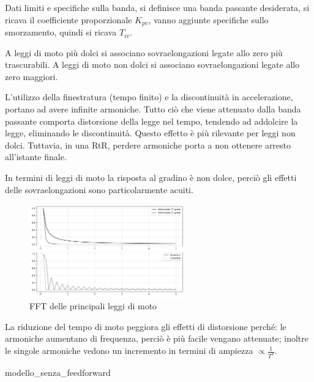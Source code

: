 Dati limiti e specifiche sulla banda, si definisce una banda passante desiderata, si ricava il coefficiente proporzionale \(K_{pv}\), vanno aggiunte specifiche sullo smorzamento, quindi si ricava \(T_{iv}\).

A leggi di moto più dolci si associano sovraelongazioni legate allo zero più trascurabili. A leggi di moto non dolci si associano sovraelongazioni legate allo zero maggiori.

L'utilizzo della finestratura (tempo finito) e la discontinuità in accelerazione, portano ad avere infinite armoniche. 
Tutto ciò che viene attenuato dalla banda passante comporta distorsione della legge nel tempo, tendendo ad addolcire la legge, eliminando le discontinuità. Questo effetto è più rilevante per leggi non dolci. Tuttavia, in una RtR, perdere armoniche porta a non ottenere arresto all'istante finale.

In termini di leggi di moto la risposta al gradino è non dolce, perciò gli effetti delle sovraelongazioni sono particolarmente acuiti.

\begin{figure}[h]
    \centering
    \includegraphics[width=0.6\textwidth]{Immagini/fft_leggi_di_moto.png}
    \caption{FFT delle principali leggi di moto}
\end{figure}

La riduzione del tempo di moto peggiora gli effetti di distorsione perché: le armoniche aumentano di frequenza, perciò è più facile vengano attenuate; inoltre le singole armoniche vedono un incremento in termini di ampiezza \(\propto \frac{1}{T^2}\).


{modello_senza_feedforward}


